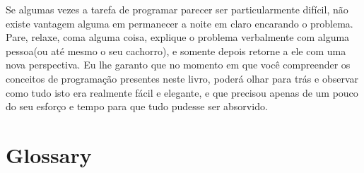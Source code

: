 Se algumas vezes a tarefa de programar parecer ser particularmente difícil, não existe vantagem alguma em permanecer a noite em claro encarando o problema. Pare, relaxe, coma alguma coisa, explique o problema verbalmente com alguma pessoa(ou até mesmo o seu cachorro), e somente depois retorne a ele com uma nova perspectiva. Eu lhe garanto que no momento em que você compreender os conceitos de programação presentes neste livro, poderá olhar para trás e observar como tudo isto era realmente fácil e elegante, e que precisou apenas de um pouco do seu esforço e tempo para que tudo pudesse ser absorvido.

\section{Glossary}

